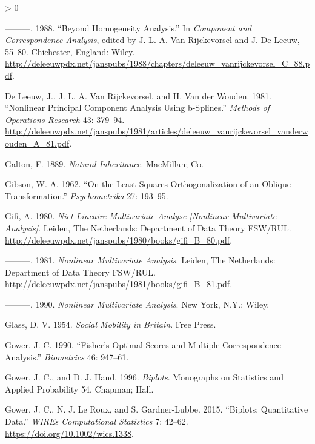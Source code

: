\documentclass[
  12pt,
]{book}
\newlength{\cslhangindent}
\newenvironment{CSLReferences}[2] %
 {%
  \setlength{\parindent}{0pt}
  \ifodd #1 \everypar{\setlength{\hangindent}{\cslhangindent}}\ignorespaces\fi
  \ifnum #2 > 0
  \setlength{\parskip}{#2\baselineskip}
  \fi
 }%
 {}
\begin{document}
\begin{CSLReferences}{1}{0}
\leavevmode\hypertarget{ref-deleeuw_vanrijckevorsel_C_88}{}%
---------. 1988. {``Beyond Homogeneity Analysis.''} In \emph{Component and Correspondence Analysis}, edited by J. L. A. Van Rijckevorsel and J. De Leeuw, 55--80. Chichester, England: Wiley. \url{http://deleeuwpdx.net/janspubs/1988/chapters/deleeuw_vanrijckevorsel_C_88.pdf}.

\leavevmode\hypertarget{ref-deleeuw_vanrijckevorsel_vanderwouden_A_81}{}%
De Leeuw, J., J. L. A. Van Rijckevorsel, and H. Van der Wouden. 1981. {``Nonlinear Principal Component Analysis Using b-Splines.''} \emph{Methods of Operations Research} 43: 379--94. \url{http://deleeuwpdx.net/janspubs/1981/articles/deleeuw_vanrijckevorsel_vanderwouden_A_81.pdf}.

\leavevmode\hypertarget{ref-galton_89}{}%
Galton, F. 1889. \emph{{Natural Inheritance}}. MacMillan; Co.

\leavevmode\hypertarget{ref-gibson_62}{}%
Gibson, W. A. 1962. {``{On the Least Squares Orthogonalization of an Oblique Transformation}.''} \emph{Psychometrika} 27: 193--95.

\leavevmode\hypertarget{ref-gifi_B_80}{}%
Gifi, A. 1980. \emph{Niet-Lineaire Multivariate Analyse {[}Nonlinear Multivariate Analysis{]}}. Leiden, The Netherlands: Department of Data Theory FSW/RUL. \url{http://deleeuwpdx.net/janspubs/1980/books/gifi_B_80.pdf}.

\leavevmode\hypertarget{ref-gifi_B_81}{}%
---------. 1981. \emph{Nonlinear Multivariate Analysis}. Leiden, The Netherlands: Department of Data Theory FSW/RUL. \url{http://deleeuwpdx.net/janspubs/1981/books/gifi_B_81.pdf}.

\leavevmode\hypertarget{ref-gifi_B_90}{}%
---------. 1990. \emph{Nonlinear Multivariate Analysis}. New York, N.Y.: Wiley.

\leavevmode\hypertarget{ref-glass_54}{}%
Glass, D. V. 1954. \emph{{Social Mobility in Britain}}. Free Press.

\leavevmode\hypertarget{ref-gower_90}{}%
Gower, J. C. 1990. {``{Fisher's Optimal Scores and Multiple Correspondence Analysis}.''} \emph{Biometrics} 46: 947--61.

\leavevmode\hypertarget{ref-gower_hand_96}{}%
Gower, J. C., and D. J. Hand. 1996. \emph{{Biplots}}. Monographs on Statistics and Applied Probability 54. Chapman; Hall.

\leavevmode\hypertarget{ref-gower_leroux_gardnerlubbe_15}{}%
Gower, J. C., N. J. Le Roux, and S. Gardner-Lubbe. 2015. {``{Biplots: Quantitative Data}.''} \emph{WIREs Computational Statistics} 7: 42--62. \url{https://doi.org/10.1002/wics.1338}.


\end{CSLReferences}
\end{document}
